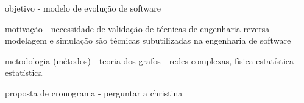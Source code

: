 objetivo
- modelo de evolução de software

motivação
- necessidade de validação de técnicas de engenharia reversa
- modelagem e simulação são técnicas subutilizadas na engenharia de software

metodologia (métodos)
- teoria dos grafos
- redes complexas, física estatística
- estatística

proposta de cronograma 
- perguntar a christina
